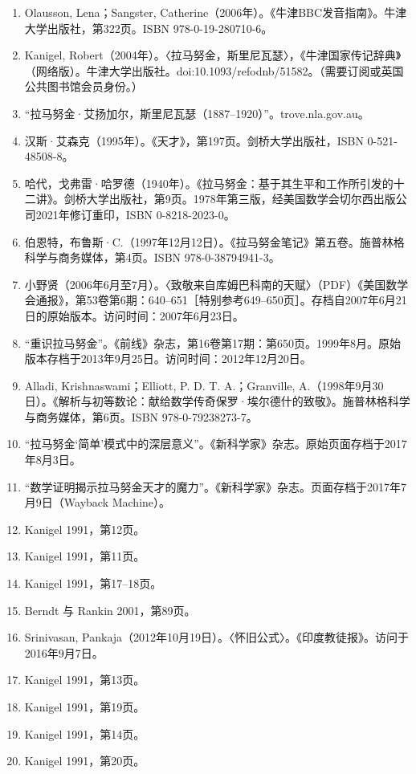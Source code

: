 \begin{enumerate}
\item Olausson, Lena；Sangster, Catherine（2006年）。《牛津BBC发音指南》。牛津大学出版社，第322页。ISBN 978-0-19-280710-6。
\item Kanigel, Robert（2004年）。〈拉马努金，斯里尼瓦瑟〉，《牛津国家传记辞典》（网络版）。牛津大学出版社。doi:10.1093/ref\:odnb/51582。（需要订阅或英国公共图书馆会员身份。）
\item “拉马努金·艾扬加尔，斯里尼瓦瑟（1887–1920）”。trove.nla.gov.au。
\item 汉斯·艾森克（1995年）。《天才》，第197页。剑桥大学出版社，ISBN 0-521-48508-8。
\item 哈代，戈弗雷·哈罗德（1940年）。《拉马努金：基于其生平和工作所引发的十二讲》。剑桥大学出版社，第9页。1978年第三版，经美国数学会切尔西出版公司2021年修订重印，ISBN 0-8218-2023-0。
\item 伯恩特，布鲁斯·C.（1997年12月12日）。《拉马努金笔记》第五卷。施普林格科学与商务媒体，第4页。ISBN 978-0-38794941-3。
\item 小野贤（2006年6月至7月）。〈致敬来自库姆巴科南的天赋〉（PDF）《美国数学会通报》，第53卷第6期：640–651［特别参考649–650页］。存档自2007年6月21日的原始版本。访问时间：2007年6月23日。
\item “重识拉马努金”。《前线》杂志，第16卷第17期：第650页。1999年8月。原始版本存档于2013年9月25日。访问时间：2012年12月20日。
\item Alladi, Krishnaswami；Elliott, P. D. T. A.；Granville, A.（1998年9月30日）。《解析与初等数论：献给数学传奇保罗·埃尔德什的致敬》。施普林格科学与商务媒体，第6页。ISBN 978-0-79238273-7。
\item “拉马努金‘简单’模式中的深层意义”。《新科学家》杂志。原始页面存档于2017年8月3日。
\item “数学证明揭示拉马努金天才的魔力”。《新科学家》杂志。页面存档于2017年7月9日（Wayback Machine）。
\item Kanigel 1991，第12页。
\item Kanigel 1991，第11页。
\item Kanigel 1991，第17–18页。
\item Berndt 与 Rankin 2001，第89页。
\item Srinivasan, Pankaja（2012年10月19日）。〈怀旧公式〉。《印度教徒报》。访问于2016年9月7日。
\item Kanigel 1991，第13页。
\item Kanigel 1991，第19页。
\item Kanigel 1991，第14页。
\item Kanigel 1991，第20页。

\end{enumerate}
